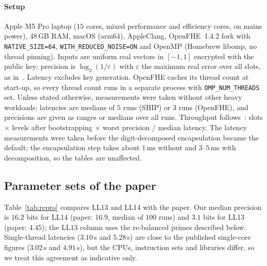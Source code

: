 \documentclass[sigconf,nonacm]{acmart}
\begin{document}
\paragraph{Setup}
Apple M5 Pro laptop ($15$ cores, mixed performance and efficiency cores, on mains power), $48$\,GB RAM, macOS (arm64), AppleClang, OpenFHE~1.4.2 fork with \texttt{NATIVE\_SIZE=64}, \texttt{WITH\_REDUCED\_NOISE=ON} and OpenMP (Homebrew libomp, no thread pinning).
Inputs are uniform real vectors in $[-1,1]$ encrypted with the public key; precision is $\log_2(1/\varepsilon)$ with $\varepsilon$ the maximum real error over all slots, as in~\cite{CHKS25}.
Latency excludes key generation.
OpenFHE caches its thread count at start-up, so every thread count runs in a separate process with \texttt{OMP\_NUM\_THREADS} set.
Unless stated otherwise, measurements were taken without other heavy workloads; latencies are medians of $5$ runs (SHIP) or $3$ runs (OpenFHE), and precisions are given as ranges or medians over all runs.
Throughput follows~\cite[Eq.~(9)]{CHKS25}: slots $\times$ levels after bootstrapping $\times$ worst precision / median latency.
The latency measurements were taken before the digit-decomposed encapsulation became the default; the encapsulation step takes about $1$\,ms without and $3$--$5$\,ms with decomposition, so the tables are unaffected.

\subsection{Parameter sets of the paper}
Table~\ref{tab:repro} compares LL13 and LL14 with the paper.
Our median precision is $16.2$ bits for LL14 (paper: $16.9$, median of $100$ runs) and $3.1$ bits for LL13 (paper: $4.45$); the LL13 column uses the re-balanced primes described below.
Single-thread latencies ($3.10$\,s and $5.28$\,s) are close to the published single-core figures ($3.02$\,s and $4.91$\,s), but the CPUs, instruction sets and libraries differ, so we treat this agreement as indicative only.
\end{document}
